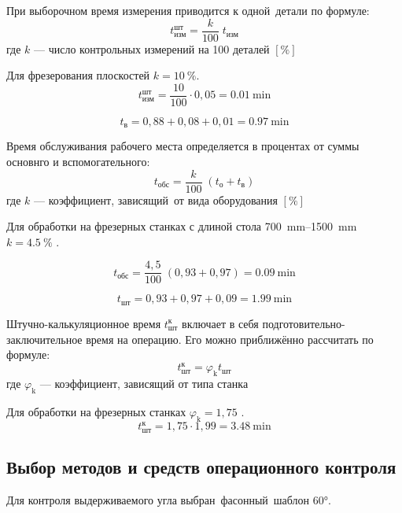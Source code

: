 \documentclass[14pt,russian,a4paper]{extreport}
\begin{document}
При выборочном время измерения приводится к одной детали по формуле:
\begin{equation*}
  t_\text{изм}^\text{шт} = \frac{k}{100} \; t_\text{изм}
\end{equation*}
где $k$ --- число контрольных измерений на 100 деталей $[\%]$

Для фрезерования плоскостей $ k = \SI{10}{\percent} $.
\begin{equation*}
  t_\text{изм}^\text{шт} = \frac{10}{100} \cdot 0,05 = \SI{0,01}{\minute}
\end{equation*}

\begin{equation*}
  t_\text{в} = 0,88 + 0,08 + 0,01 = \SI{0,97}{\minute}
\end{equation*}

Время обслуживания рабочего места определяется в процентах от суммы основнго и вспомогательного: 
\begin{equation*}
  t_\text{обс} = \frac{k}{100} \; (t_\text{о} + t_\text{в})
\end{equation*}
где $k$ --- коэффициент, зависящий от вида оборудования $[\%]$

Для обработки на фрезерных станках с длиной стола \SIrange{700}{1500}{\milli\meter} $ k = \SI{4,5}{\percent} $ \cite[прил.~5]{malzen:normirovanie}.

\begin{equation*}
  t_\text{обс} = \frac{4,5}{100} \; (0,93 + 0,97) = \SI{0,09}{\minute}
\end{equation*}

\begin{equation*}
  t_\text{шт} = 0,93 + 0,97 + 0,09 = \SI{1,99}{\minute}
\end{equation*}

Штучно-калькуляционное время $t_\text{шт}^\text{к}$ включает в себя подготовительно-заключительное время на операцию. Его можно приближённо рассчитать по формуле: 
\begin{equation*}
  t_\text{шт}^\text{к} = \varphi_\text{k} t_\text{шт}
\end{equation*}
где $\varphi_\text{k}$ --- коэффициент, зависящий от типа станка

Для обработки на фрезерных станках $ \varphi_\text{k} = 1,75 $ \cite[прил.~7]{malzen:normirovanie}.
\begin{equation*}
  t_\text{шт}^\text{к} = 1,75 \cdot 1,99 = \SI{3,48}{\minute}
\end{equation*}


\subsection{Выбор методов и средств операционного контроля}
Для контроля выдерживаемого угла выбран фасонный шаблон $\ang{60}$.
\end{document}
